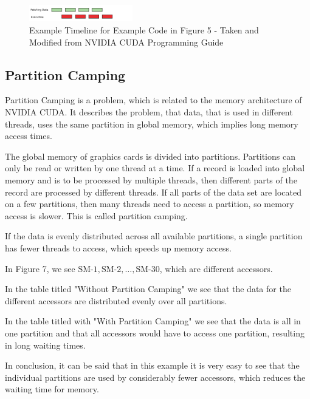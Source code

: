 \documentclass[conference]{IEEEtran}
\begin{document}
		\begin{figure}[htbp]
			\centerline{\includegraphics[width=0.4\textwidth]{DataPrefetching.png}}
			\caption{Example Timeline for Example Code in Figure 5 - Taken and Modified from NVIDIA CUDA Programming Guide}
			\label{fig2}
		\end{figure}
		
	\subsection{Partition Camping}
		
		
		Partition Camping is a problem, which is related to the memory architecture of NVIDIA CUDA. It describes the problem, that data, that is used in different threads, uses the same partition in global memory, which implies long memory access times. 
		
		
		The global memory of graphics cards is divided into partitions. Partitions can only be read or written by one thread at a time. If a record is loaded into global memory and is to be processed by multiple threads, then different parts of the record are processed by different threads.  If all parts of the data set are located on a few partitions, then many threads need to access a partition, so memory access is slower. This is called partition camping.
		
		If the data is evenly distributed across all available partitions, a single partition has fewer threads to access, which speeds up memory access.
		
		
		In Figure 7, we see $\text{SM-1}, \text{SM-2}, \dots, \text{SM-30}$, which are different accessors. 
		
		In the table titled "Without Partition Camping" we see that the data for the different accessors are distributed evenly over all partitions. 
		
		In the table titled with "With Partition Camping" we see that the data is all in one partition and that all accessors would have to access one partition, resulting in long waiting times.
		
		In conclusion, it can be said that in this example it is very easy to see that the individual partitions are used by considerably fewer accessors, which reduces the waiting time for memory.
			
\end{document}
